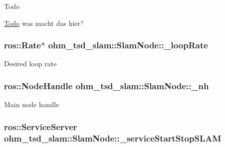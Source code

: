 \begin{DoxyRefDesc}{Todo}
\item[\hyperlink{todo__todo000005}{Todo}]was macht das hier? \end{DoxyRefDesc}
\hypertarget{classohm__tsd__slam_1_1SlamNode_ad0a9e371e33605f4a5666060949473a5}{
\subsubsection[{\-\_\-loop\-Rate}]{\setlength{\rightskip}{0pt plus 5cm}ros\-::\-Rate$\ast$ ohm\-\_\-tsd\-\_\-slam\-::\-Slam\-Node\-::\-\_\-loop\-Rate\hspace{0.3cm}{\ttfamily [private]}}}\label{classohm__tsd__slam_1_1SlamNode_ad0a9e371e33605f4a5666060949473a5}
Desired loop rate \hypertarget{classohm__tsd__slam_1_1SlamNode_ad80198ebc14aa678f72738ba64d612bc}{
\subsubsection[{\-\_\-nh}]{\setlength{\rightskip}{0pt plus 5cm}ros\-::\-Node\-Handle ohm\-\_\-tsd\-\_\-slam\-::\-Slam\-Node\-::\-\_\-nh\hspace{0.3cm}{\ttfamily [private]}}}\label{classohm__tsd__slam_1_1SlamNode_ad80198ebc14aa678f72738ba64d612bc}
Main node handle \hypertarget{classohm__tsd__slam_1_1SlamNode_aa693190f5f7afb47e0933cdc62abe488}{
\subsubsection[{\-\_\-service\-Start\-Stop\-S\-L\-A\-M}]{\setlength{\rightskip}{0pt plus 5cm}ros\-::\-Service\-Server ohm\-\_\-tsd\-\_\-slam\-::\-Slam\-Node\-::\-\_\-service\-Start\-Stop\-S\-L\-A\-M\hspace{0.3cm}{\ttfamily [private]}}}\label{classohm__tsd__slam_1_1SlamNode_aa693190f5f7afb47e0933cdc62abe488}
